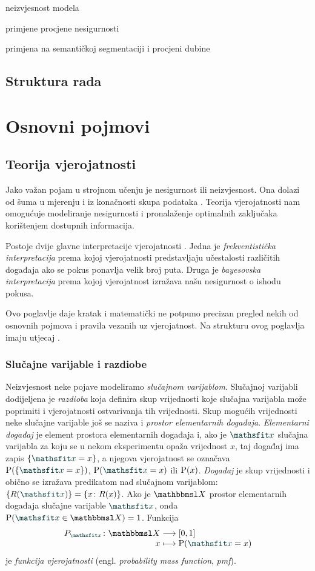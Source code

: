 \documentclass[utf8, diplomski, lmodern]{fer}
\begin{document}
neizvjesnost modela

primjene procjene nesigurnosti

primjena na semantičkoj segmentaciji i procjeni dubine


\section{Struktura rada}



\chapter{Osnovni pojmovi}


\section{Teorija vjerojatnosti}

Jako važan pojam u strojnom učenju je nesigurnost ili neizvjesnost. Ona dolazi od šuma u mjerenju i iz konačnosti skupa podataka \citep{Bishop:2006:PRML}. Teorija vjerojatnosti nam omogućuje modeliranje nesigurnosti i pronalaženje optimalnih zaključaka korištenjem dostupnih informacija.

Postoje dvije glavne interpretacije vjerojatnosti \citep{Murphy:2012:MLPP}. Jedna je \emph{frekventistička interpretacija} prema kojoj vjerojatnosti predstavljaju učestalosti različitih događaja ako se pokus ponavlja velik broj puta. Druga je \emph{bayesovska interpretacija} prema kojoj vjerojatnost izražava našu nesigurnost o ishodu pokusa. 
 
Ovo poglavlje daje kratak i matematički ne potpuno precizan pregled nekih od osnovnih pojmova i pravila vezanih uz vjerojatnost. Na strukturu ovog poglavlja imaju utjecaj \citet{Goodfellow:2016:DL,Murphy:2012:MLPP}.

\subsection{Slučajne varijable i razdiobe}

Neizvjesnost neke pojave modeliramo \emph{slučajnom varijablom}. Slučajnoj varijabli dodijeljena je \emph{razdioba} koja definira skup vrijednosti koje slučajna varijabla može poprimiti i vjerojatnosti ostvarivanja tih vrijednosti. Skup mogućih vrijednosti neke slučajne varijable još se naziva i \emph{prostor elementarnih događaja}. \emph{Elementarni događaj} je element prostora elementarnih događaja i, ako je $\rvar x$ slučajna varijabla za koju se u nekom eksperimentu opaža vrijednost $x$, taj događaj ima zapis $\cbr{\rvar x = x}$, a njegova vjerojatnost se označava $\P(\cbr{\rvar x = x})$, $\P(\rvar x = x)$ ili $\P(x)$. \emph{Događaj} je skup vrijednosti i obično se izražava predikatom nad slučajnom varijablom: $\cbr{R(\rvar x)}=\cbr{x\colon R(x)}$. Ako je $\set X$ prostor elementarnih događaja slučajne varijable $\rvar x$, onda $\P(\rvar x\in \set X)=1$. Funkcija 
\begin{align*}
\fullfunction{P_{\rvar x}}{\set X}{\intcc{0,1}}{x}{\P(\rvar x=x)}
\end{align*}
je \emph{funkcija vjerojatnosti} (engl. \textit{probability mass function}, \textit{pmf}).
\end{document}
